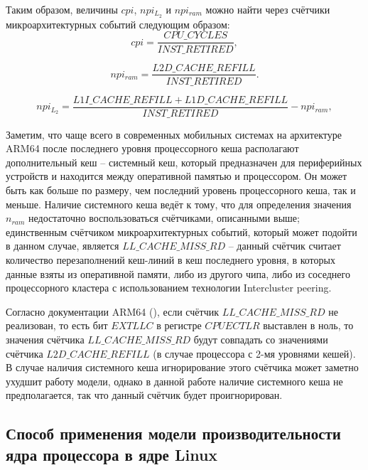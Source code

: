     Таким образом, величины $cpi$, $npi_{L_2}$ и $npi_{ram}$ можно найти через счётчики микроархитектурных
    событий следующим образом:
    \begin{equation}
        cpi = \frac{CPU\_CYCLES}{INST\_RETIRED},
    \end{equation}

    \begin{equation}
        npi_{ram} = \frac{L2D\_CACHE\_REFILL}{INST\_RETIRED}.
    \end{equation}

    \begin{equation}
        npi_{L_2} = \frac{L1I\_CACHE\_REFILL + L1D\_CACHE\_REFILL}{INST\_RETIRED} - npi_{ram},
    \end{equation}

    Заметим, что чаще всего в современных мобильных системах на архитектуре ARM64 после последнего
    уровня процессорного кеша располагают дополнительный кеш -- системный кеш,
    который предназначен для периферийных устройств и находится между оперативной памятью и процессором.
    Он может быть как больше по размеру, чем последний уровень процессорного кеша, так и меньше.
    Наличие системного кеша ведёт к тому, что для определения значения $n_{ram}$ недостаточно
    воспользоваться счётчиками, описанными выше; единственным счётчиком микроархитектурных событий,
    который может подойти в данном случае, является $LL\_CACHE\_MISS\_RD$ -- данный счётчик считает
    количество перезаполнений кеш-линий в кеш последнего уровня, в которых данные взяты из оперативной памяти,
    либо из другого чипа, либо из соседнего процессорного кластера с использованием технологии Intercluster peering.

    Согласно документации ARM64 (\cite{ArmPerfAnalyses}), если счётчик $LL\_CACHE\_MISS\_RD$ не реализован,
    то есть бит $EXTLLC$ в регистре $CPUECTLR$ выставлен в ноль, то значения счётчика $LL\_CACHE\_MISS\_RD$
    будут совпадать со значениями счётчика $L2D\_CACHE\_REFILL$ (в случае процессора с 2-мя уровнями кешей).
    В случае наличия системного кеша игнорирование этого счётчика может заметно ухудшит
    работу модели, однако в данной работе наличие системного кеша не предполагается, так что данный
    счётчик будет проигнорирован.

\subsection{Способ применения модели производительности ядра процессора в ядре Linux}

